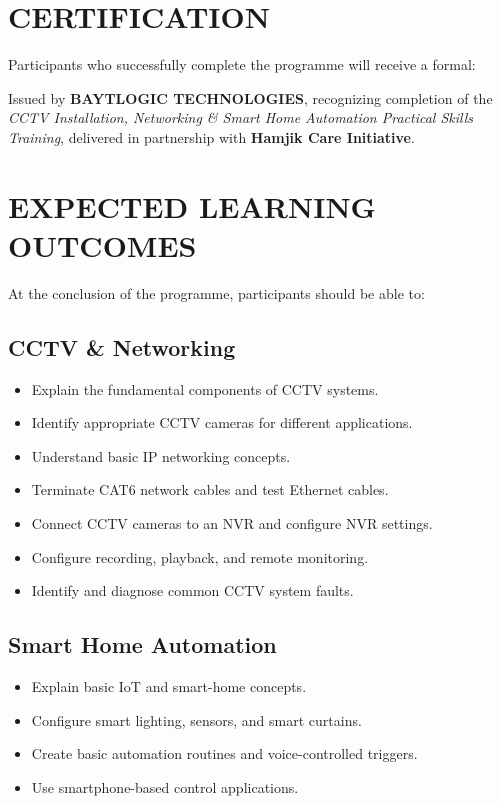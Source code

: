 \documentclass[11pt,a4paper]{article}
\newcommand{\checkicon}{\textcolor{baytblue}{\faCheckCircle}\ }
\begin{document}
\section{CERTIFICATION}
Participants who successfully complete the programme will receive a formal:
\begin{center}
\end{center}
\noindent Issued by \textbf{BAYTLOGIC TECHNOLOGIES}, recognizing completion of the \textit{CCTV Installation, Networking \& Smart Home Automation Practical Skills Training}, delivered in partnership with \textbf{Hamjik Care Initiative}.

\section{EXPECTED LEARNING OUTCOMES}
At the conclusion of the programme, participants should be able to:

\subsection{CCTV \& Networking}
\begin{itemize}[label=\checkicon]
    \item Explain the fundamental components of CCTV systems.
    \item Identify appropriate CCTV cameras for different applications.
    \item Understand basic IP networking concepts.
    \item Terminate CAT6 network cables and test Ethernet cables.
    \item Connect CCTV cameras to an NVR and configure NVR settings.
    \item Configure recording, playback, and remote monitoring.
    \item Identify and diagnose common CCTV system faults.
\end{itemize}

\subsection{Smart Home Automation}
\begin{itemize}[label=\checkicon]
    \item Explain basic IoT and smart-home concepts.
    \item Configure smart lighting, sensors, and smart curtains.
    \item Create basic automation routines and voice-controlled triggers.
    \item Use smartphone-based control applications.
\end{itemize}
\end{document}
